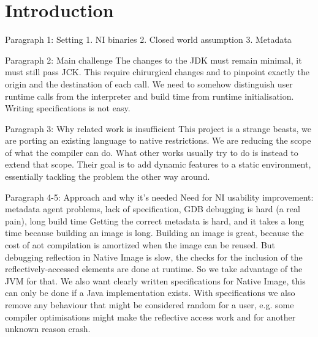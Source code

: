 \chapter{Introduction}






Paragraph 1: Setting
1. NI binaries
2. Closed world assumption
3. Metadata

Paragraph 2: Main challenge
The changes to the JDK must remain minimal, it must still pass JCK. This require chirurgical changes and to pinpoint exactly the origin and the destination of each call. We need to somehow distinguish user runtime calls from the interpreter and build time from runtime initialisation. Writing specifications is not easy. 

Paragraph 3: Why related work is insufficient
This project is a strange beasts, we are porting an existing language to native restrictions. We are reducing the scope of what the compiler can do. What other works usually try to do is instead to extend that scope. Their goal is to add dynamic features to a static environment, essentially tackling the problem the other way around.    

Paragraph 4-5: Approach and why it's needed
Need for NI usability improvement: metadata agent problems, lack of specification, GDB debugging is hard (a real pain), long build time
Getting the correct metadata is hard, and it takes a long time because building an image is long. Building an image is great, because the cost of aot compilation is amortized when the image can be reused. But debugging reflection in Native Image is slow, the checks for the inclusion of the reflectively-accessed elements are done at runtime. So we take advantage of the JVM for that.  
We also want clearly written specifications for Native Image, this can only be done if a Java implementation exists. With specifications we also remove any behaviour that might be considered random for a user, e.g. some compiler optimisations might make the reflective access work and for another unknown reason crash. 

